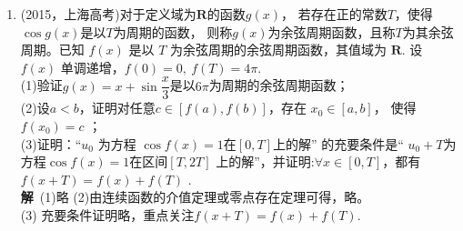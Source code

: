 \begin{enumerate}[label={【\textbf{例\thechapter.\arabic*}】},
 leftmargin=\inteval{\myenumleftmargin}pt,
 itemsep=\inteval{\myenumitempsep}pt,
 itemindent=\inteval{\myenumitemindent}pt]
\item (2015，上海高考)对于定义域为$ \mathbf{R} $的函数$ g(x) $，
若存在正的常数$ T $，使得$ \cos g(x) $是以$ T $为周期的函数，
则称$ g(x) $为余弦周期函数，且称$ T $为其余弦周期。已知 $ f(x) $
是以 $ T $ 为余弦周期的余弦周期函数，其值域为 $ \mathbf{R} $.
设 $ f(x) $ 单调递增，$ f(0)=0,\ f(T)=4\pi $. \\
(1)验证$ g(x)=x+\sin\dfrac{x}{3} $是以$ 6\pi $为周期的余弦周期函数；\\
(2)设$ a<b $，证明对任意$ c\in[f(a),f(b)] $，存在 $ x_{0}\in[a,b] $，
使得 $ f(x_{0})=c $ ；\\
(3)证明：“$ u_{0} $ 为方程 $ \cos f(x)=1 $在$ [0,T] $上的解”
的充要条件是“ $ u_{0}+T $为方程$ \cos f(x)=1 $在区间$ [T,2T] $
上的解”，并证明:$\forall x\in[0,T] $，都有$ f(x+T)=f(x)+f(T) $ .\\
\textbf{解}\ (1)略 (2)由连续函数的介值定理或零点存在定理可得，略。 \\
(3) 充要条件证明略，重点关注$ f(x+T)=f(x)+f(T) $. \\

\end{enumerate}
